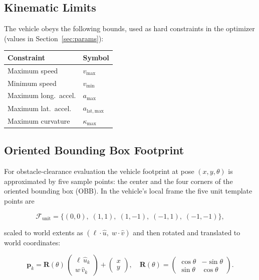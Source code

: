 \documentclass[11pt,a4paper]{article}
\begin{document}
\subsection{Kinematic Limits}

The vehicle obeys the following bounds, used as hard constraints in the
optimizer (values in Section~\ref{sec:params}):

\begin{center}
\begin{tabular}{ll}
\toprule
Constraint & Symbol \\
\midrule
Maximum speed          & $v_{\max}$ \\
Minimum speed          & $v_{\min}$ \\
Maximum long.\ accel.  & $a_{\max}$ \\
Maximum lat.\ accel.   & $a_{\mathrm{lat,max}}$ \\
Maximum curvature      & $\kappa_{\max}$ \\
\bottomrule
\end{tabular}
\end{center}

\subsection{Oriented Bounding Box Footprint}

For obstacle-clearance evaluation the vehicle footprint at pose
$(x, y, \theta)$ is approximated by five sample points: the center and the
four corners of the oriented bounding box (OBB).
In the vehicle's local frame the five unit template points are

\begin{equation}
  \mathcal{F}_{\mathrm{unit}} =
  \{(0,0),\;(1,1),\;(1,-1),\;(-1,1),\;(-1,-1)\},
\end{equation}

scaled to world extents as $(\ell \cdot \hat{u},\; w \cdot \hat{v})$ and then
rotated and translated to world coordinates:

\begin{equation}
  \mathbf{p}_k = \mathbf{R}(\theta)\,
    \begin{pmatrix} \ell\,\hat{u}_k \\ w\,\hat{v}_k \end{pmatrix}
  + \begin{pmatrix} x \\ y \end{pmatrix},
  \quad
  \mathbf{R}(\theta) = \begin{pmatrix}
    \cos\theta & -\sin\theta \\ \sin\theta & \cos\theta
  \end{pmatrix}.
\end{equation}
\end{document}
